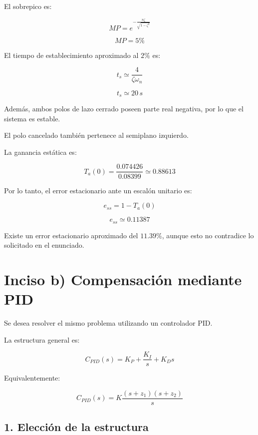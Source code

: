 \documentclass[10pt]{article}
\begin{document}
El sobrepico es:

\[
MP=
e^{-\frac{\pi\zeta}{\sqrt{1-\zeta^2}}}
\]

\begin{equation}
    \boxed{MP=5\%}
\end{equation}

El tiempo de establecimiento aproximado
al $2\%$ es:

\[
t_s\simeq\frac{4}{\zeta\omega_n}
\]

\begin{equation}
    \boxed{t_s\simeq20\,s}
\end{equation}

Además, ambos polos de lazo cerrado
poseen parte real negativa, por lo
que el sistema es estable.

El polo cancelado también pertenece
al semiplano izquierdo.

La ganancia estática es:

\[
T_a(0)=
\frac{0.074426}{0.08399}
\simeq0.88613
\]

Por lo tanto, el error estacionario
ante un escalón unitario es:

\[
e_{ss}=1-T_a(0)
\]

\begin{equation}
    \boxed{e_{ss}\simeq0.11387}
\end{equation}

Existe un error estacionario aproximado
del $11.39\%$, aunque esto no contradice
lo solicitado en el enunciado.


\section*{Inciso b) Compensación mediante PID}

Se desea resolver el mismo problema
utilizando un controlador PID.

La estructura general es:

\begin{equation}
C_{PID}(s)=K_P+\frac{K_I}{s}+K_Ds
\end{equation}

Equivalentemente:

\begin{equation}
\boxed{
C_{PID}(s)=
K\frac{(s+z_1)(s+z_2)}{s}
}
\end{equation}

\subsection*{1. Elección de la estructura}
\end{document}
